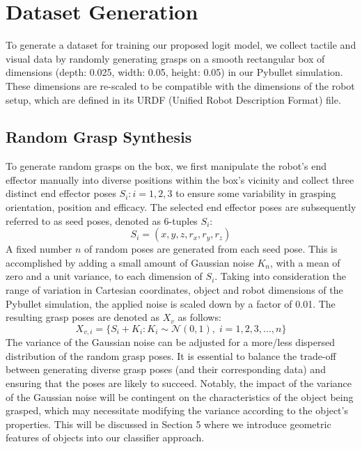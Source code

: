 \documentclass[11pt, a4paper]{report}
\begin{document}
\newpage
\section{Dataset Generation}\label{sec:4.2}
To generate a dataset for training our proposed logit model, we collect tactile and visual data by randomly generating grasps on a smooth rectangular box of dimensions (depth: 0.025, width: 0.05, height: 0.05) in our Pybullet simulation. These dimensions are re-scaled to be compatible with the dimensions of the robot setup, which are defined in its URDF (Unified Robot Description Format) file.


\subsection{Random Grasp Synthesis}\label{sec:4.2.1}
To generate random grasps on the box, we first manipulate the robot's end effector manually into diverse positions within the box's vicinity and collect three distinct end effector poses $S_i:i=1,2,3$ to ensure some variability in grasping orientation, position and efficacy. The selected end effector poses are subsequently referred to as seed poses, denoted as 6-tuples $S_i$:
\begin{equation}
    S_i=(x,y,z,r_x,r_y,r_z)
\end{equation}
A fixed number $n$ of random poses are generated from each seed pose. This is accomplished by adding a small amount of Gaussian noise $K_n$, with a mean of zero and a unit variance, to each dimension of $S_i$. Taking into consideration the range of variation in Cartesian coordinates, object and robot dimensions of the Pybullet simulation, the applied noise is scaled down by a factor of 0.01. The resulting grasp poses are denoted as $X_v$ as follows:
\begin{equation}
    X_{v,i}=\Big\{S_i+K_i:K_i\sim\mathcal{N}(0,1),\;i=1,2,3,...,n\Big\}
\end{equation}
The variance of the Gaussian noise can be adjusted for a more/less dispersed distribution of the random grasp poses. It is essential to balance the trade-off between generating diverse grasp poses (and their corresponding data) and ensuring that the poses are likely to succeed. Notably, the impact of the variance of the Gaussian noise will be contingent on the characteristics of the object being grasped, which may necessitate modifying the variance according to the object's properties. This will be discussed in Section 5 where we introduce geometric features of objects into our classifier approach.
 
\end{document}
